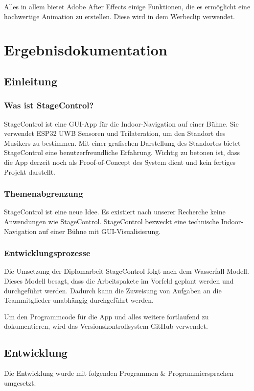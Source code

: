 Alles in allem bietet Adobe After Effects einige Funktionen, die es ermöglicht eine hochwertige Animation zu erstellen. Diese wird in dem Werbeclip verwendet. 

\chapter{Ergebnisdokumentation}
\section{Einleitung}
\subsection{Was ist StageControl?}
StageControl ist eine GUI-App für die Indoor-Navigation auf einer Bühne. Sie verwendet ESP32 UWB Sensoren und Trilateration, um den Standort des Musikers zu bestimmen. Mit einer grafischen Darstellung des Standortes bietet StageControl eine benutzerfreundliche Erfahrung. Wichtig zu betonen ist, dass die App derzeit noch als Proof-of-Concept des System dient und kein fertiges Projekt darstellt. 

\subsection{Themenabgrenzung}
StageControl ist eine neue Idee. Es existiert nach unserer Recherche keine Anwendungen wie StageControl. StageControl bezweckt eine technische Indoor-Navigation auf einer Bühne mit GUI-Visualisierung. 

\subsection{Entwicklungsprozesse}
Die Umsetzung der Diplomarbeit StageControl folgt nach dem Wasserfall-Modell. Dieses Modell besagt, dass die Arbeitspakete im Vorfeld geplant werden und durchgeführt werden. Dadurch kann die Zuweisung von Aufgaben an die Teammitglieder unabhängig durchgeführt werden. 

Um den Programmcode für die App und alles weitere fortlaufend zu dokumentieren, wird das Versionskontrollsystem GitHub verwendet. 

\section{Entwicklung}
Die Entwicklung wurde mit folgenden Programmen \& Programmiersprachen umgesetzt.

